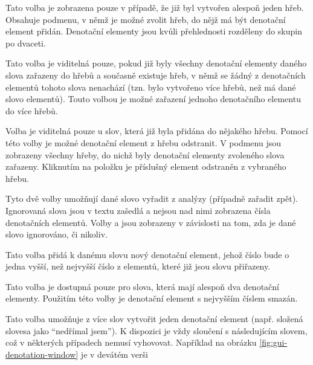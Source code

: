 \documentclass[dp.tex]{subfiles}
\begin{document}
\begin{description}[style=nextline]
	\item[\keys{Přidat do hřebu $\kern 10pt\triangleright$}] Tato volba je zobrazena pouze v případě, že již byl vytvořen alespoň jeden hřeb. Obsahuje podmenu, v němž je možné zvolit hřeb, do nějž má být denotační element přidán. Denotační elementy jsou kvůli přehlednosti rozděleny do skupin po dvaceti.

	\item[\keys{Přidat do jiného hřebu}] Tato volba je viditelná pouze, pokud již byly všechny denotační elementy daného slova zařazeny do hřebů a současně existuje hřeb, v němž se žádný z denotačních elementů tohoto slova nenachází (tzn. bylo vytvořeno více hřebů, než má dané slovo elementů). Touto volbou je možné zařazení jednoho denotačního elementu do více hřebů.

	\item[\keys{Odebrat z hřebu $\kern 10pt\triangleright$}] Volba je viditelná pouze u slov, která již byla přidána do nějakého hřebu. Pomocí této volby je možné denotační element z hřebu odstranit. V podmenu jsou zobrazeny všechny hřeby, do nichž byly denotační elementy zvoleného slova zařazeny. Kliknutím na položku je příslušný element odstraněn z vybraného hřebu.

	\item[\keys{Ignorovat} / \keys{Brát v potaz}] Tyto dvě volby umožňují dané slovo vyřadit z analýzy (případně zařadit zpět). Ignorovaná slova jsou v textu zašedlá a nejsou nad nimi zobrazena čísla denotačních elementů. Volby  a  jsou zobrazeny v závislosti na tom, zda je dané slovo  ignorováno, či nikoliv.

	\item[\keys{Přidat denotační element}] Tato volba přidá k danému slovu nový denotační element, jehož číslo bude o jedna vyšší, než nejvyšší číslo z elementů, které již jsou slovu přiřazeny. 

	\item[\keys{Odebrat denotační element}] Tato volba je dostupná pouze pro slova, která mají alespoň dva denotační elementy. Použitím této volby je denotační element s nejvyšším číslem smazán.

	\item[\keys{Sloučit s [\ldots]}] Tato volba umožňuje z více slov vytvořit jeden denotační element (např. složená slovesa jako \enquote{nedřímal jsem}). K dispozici je vždy sloučení s následujícím slovem, což v některých případech nemusí vyhovovat. Například na obrázku \ref{fig:gui-denotation-window} je v devátém verši


\end{description}
\end{document}
